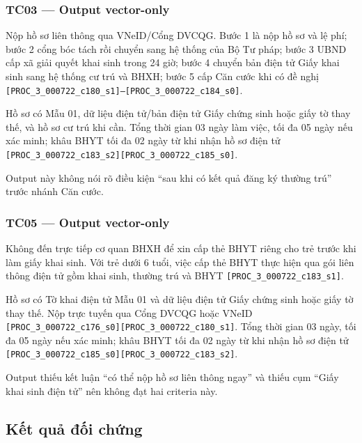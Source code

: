 \documentclass[11pt,a4paper]{article}
\newcommand{\src}[1]{\texttt{#1}}
\begin{document}
\subsubsection*{TC03 --- Output vector-only}
\begin{answerbox}
Nộp hồ sơ liên thông qua VNeID/Cổng DVCQG. Bước 1 là nộp hồ sơ và lệ phí; bước 2 cổng bóc tách rồi chuyển sang hệ thống của Bộ Tư pháp; bước 3 UBND cấp xã giải quyết khai sinh trong 24 giờ; bước 4 chuyển bản điện tử Giấy khai sinh sang hệ thống cư trú và BHXH; bước 5 cấp Căn cước khi có đề nghị \src{[PROC\_3\_000722\_c180\_s1]--[PROC\_3\_000722\_c184\_s0]}.

Hồ sơ có Mẫu 01, dữ liệu điện tử/bản điện tử Giấy chứng sinh hoặc giấy tờ thay thế, và hồ sơ cư trú khi cần. Tổng thời gian 03 ngày làm việc, tối đa 05 ngày nếu xác minh; khâu BHYT tối đa 02 ngày từ khi nhận hồ sơ điện tử \src{[PROC\_3\_000722\_c183\_s2][PROC\_3\_000722\_c185\_s0]}.

Output này không nói rõ điều kiện “sau khi có kết quả đăng ký thường trú” trước nhánh Căn cước.
\end{answerbox}

\subsubsection*{TC05 --- Output vector-only}
\begin{answerbox}
Không đến trực tiếp cơ quan BHXH để xin cấp thẻ BHYT riêng cho trẻ trước khi làm giấy khai sinh. Với trẻ dưới 6 tuổi, việc cấp thẻ BHYT thực hiện qua gói liên thông điện tử gồm khai sinh, thường trú và BHYT \src{[PROC\_3\_000722\_c183\_s1]}.

Hồ sơ có Tờ khai điện tử Mẫu 01 và dữ liệu điện tử Giấy chứng sinh hoặc giấy tờ thay thế. Nộp trực tuyến qua Cổng DVCQG hoặc VNeID \src{[PROC\_3\_000722\_c176\_s0][PROC\_3\_000722\_c180\_s1]}. Tổng thời gian 03 ngày, tối đa 05 ngày nếu xác minh; khâu BHYT tối đa 02 ngày từ khi nhận hồ sơ điện tử \src{[PROC\_3\_000722\_c185\_s0][PROC\_3\_000722\_c183\_s2]}.

Output thiếu kết luận “có thể nộp hồ sơ liên thông ngay” và thiếu cụm “Giấy khai sinh điện tử” nên không đạt hai criteria này.
\end{answerbox}

\subsection{Kết quả đối chứng}
\end{document}
